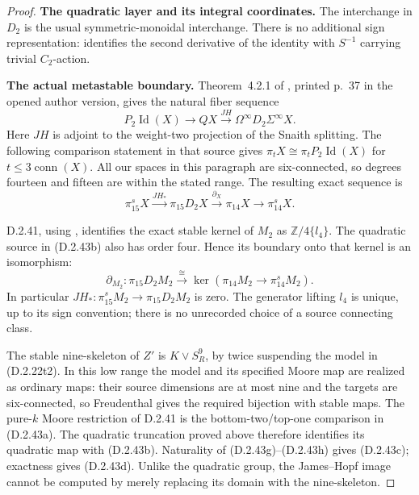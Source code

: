 \begin{proof}
\textbf{The quadratic layer and its integral coordinates.}
The interchange in $D_2$ is the usual symmetric-monoidal
interchange. There is no additional sign representation:
\cite[Section~8, p.~704]{FGHGoodwillie2003} identifies the
second derivative of the identity with $S^{-1}$ carrying
trivial $C_2$-action.



\medskip\noindent
\textbf{The actual metastable boundary.}
Theorem~4.2.1 of \cite{EH5Behrens2012}, printed p.~37 in
the opened author version, gives the natural fiber sequence
\[
 P_2\operatorname{Id}(X)\longrightarrow QX
       \xrightarrow{JH}\Omega^\infty D_2\Sigma^\infty X.
 \tag{D.2.43f}
\]
Here $JH$ is adjoint to the weight-two projection of the
Snaith splitting. The following comparison statement in that
source gives
$\pi_tX\cong\pi_tP_2\operatorname{Id}(X)$ for
$t\leq3\operatorname{conn}(X)$. All our spaces in this
paragraph are six-connected, so degrees fourteen and fifteen
are within the stated range. The resulting exact sequence is
\[
 \pi_{15}^{s}X\xrightarrow{JH_*}\pi_{15}D_2X
       \xrightarrow{\partial_X}\pi_{14}X
       \longrightarrow\pi_{14}^{s}X.
 \tag{D.2.43g}
\]

D.2.41, using
\cite[Lemmas~2.7--2.8(ii), p.~523]{EH5MorisugiMukai2000},
identifies the exact stable kernel of $M_2$ as
$\mathbb Z/4\{l_4\}$. The quadratic source in
\textup{(D.2.43b)} also has order four. Hence its boundary
onto that kernel is an isomorphism:
\[
 \partial_{M_2}:\pi_{15}D_2M_2
       \xrightarrow{\ \cong\ }
       \ker(\pi_{14}M_2\to\pi_{14}^{s}M_2).
 \tag{D.2.43h}
\]
In particular $JH_*:\pi_{15}^{s}M_2\to\pi_{15}D_2M_2$
is zero. The generator lifting $l_4$ is unique, up to its
sign convention; there is no unrecorded choice of a source
connecting class.

The stable nine-skeleton of $Z'$ is $K\vee S^9_R$,
by twice suspending the model in \textup{(D.2.22t2)}.
In this low range the model and its specified Moore map
are realized as ordinary maps: their source dimensions are
at most nine and the targets are six-connected, so
Freudenthal gives the required bijection with stable maps.
The pure-$k$ Moore restriction of D.2.41 is the
bottom-two/top-one comparison in \textup{(D.2.43a)}.
The quadratic truncation proved above therefore identifies
its quadratic map with \textup{(D.2.43b)}.
Naturality of \textup{(D.2.43g)--(D.2.43h)} gives
\textup{(D.2.43c)}; exactness gives \textup{(D.2.43d)}.
Unlike the quadratic group, the James--Hopf image cannot
be computed by merely replacing its domain with the
nine-skeleton.


\end{proof}
